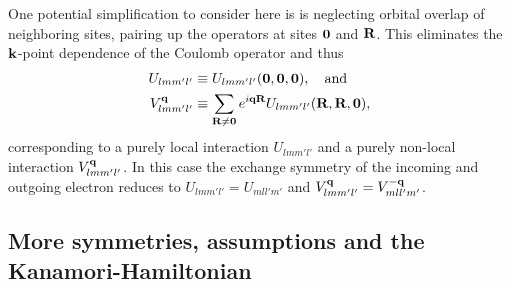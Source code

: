 \documentclass[../../main.tex]{subfiles}
\begin{document}
One potential simplification to consider here is is neglecting orbital overlap of neighboring sites, pairing up the operators at sites $\textbf{0}$ and $\textbf{R}$. This eliminates the $\textbf{k}$-point dependence of the Coulomb operator and thus
\begin{subequations}
\begin{align}
	U_{lmm'l'}&\equiv U_{lmm'l'}(\textbf{0},\textbf{0},\textbf{0}),\quad\text{and}\\
	V^{\textbf{q}}_{lmm'l'}&\equiv\sum_{\textbf{R}\neq\textbf{0}}e^{i\textbf{qR}}U_{lmm'l'}(\textbf{R},\textbf{R},\textbf{0}),
\end{align}
\end{subequations}
corresponding to a purely local interaction $U_{lmm'l'}$ and a purely non-local interaction $V^{\textbf{q}}_{lmm'l'}$. In this case the exchange symmetry of the incoming and outgoing electron reduces to $U_{lmm'l'}=U_{mll'm'}$ and $V^{\textbf{q}}_{lmm'l'}=V^{-\textbf{q}}_{mll'm'}$.


\subsection{More symmetries, assumptions and the Kanamori-Hamiltonian}
\end{document}
